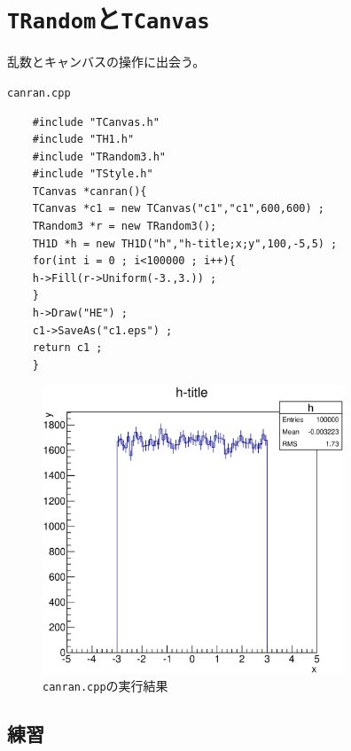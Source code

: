 \documentclass{jarticle}
\begin{document}
 \section{\texttt{TRandom}と\texttt{TCanvas}}

 乱数とキャンバスの操作に出会う。

 \begin{itembox}{\texttt{canran.cpp}}
\begin{verbatim}
	#include "TCanvas.h"
	#include "TH1.h"
	#include "TRandom3.h"
	#include "TStyle.h"
	TCanvas *canran(){
	TCanvas *c1 = new TCanvas("c1","c1",600,600) ;
	TRandom3 *r = new TRandom3();
	TH1D *h = new TH1D("h","h-title;x;y",100,-5,5) ;
	for(int i = 0 ; i<100000 ; i++){
	h->Fill(r->Uniform(-3.,3.)) ;
	}
	h->Draw("HE") ;
	c1->SaveAs("c1.eps") ;
	return c1 ;
	}
\end{verbatim}
 \end{itembox}


 \begin{figure}[htbp]
  \begin{center}
   \includegraphics[width = 90mm] {./picture/canrancanvas1.eps}
  \end{center}
  \caption{\texttt{canran.cpp}の実行結果}
  \label{Fig:canrancanvas1}
 \end{figure}


  \subsection{練習}
\end{document}

